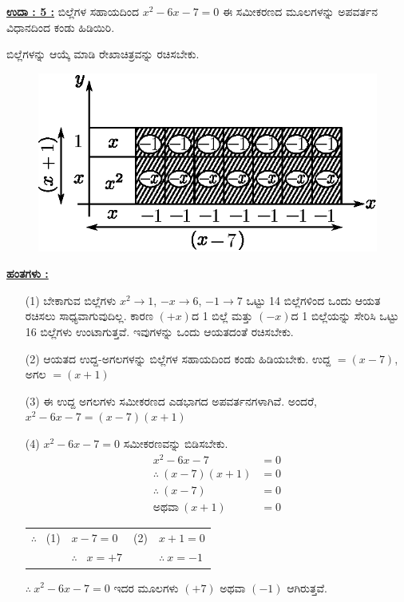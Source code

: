 \noindent
{\textbf{\underline{ಉದಾ : 5 :}}} ಬಿಲ್ಲೆಗಳ ಸಹಾಯದಿಂದ $x^2 - 6x - 7 = 0$ ಈ ಸಮೀಕರಣದ ಮೂಲ\-ಗಳನ್ನು ಅಪವರ್ತನ ವಿಧಾನದಿಂದ ಕಂಡು ಹಿಡಿಯಿರಿ. 

ಬಿಲ್ಲೆಗಳನ್ನು ಆಯ್ಕೆ ಮಾಡಿ ರೇಖಾಚಿತ್ರವನ್ನು ರಚಿಸಬೇಕು.
\begin{figure}[H]
\centering
\includegraphics[scale=0.8]{src/figure/chap3/fig3-55b.eps}
\end{figure}

\noindent
{\textbf{\underline{ಹಂತಗಳು :}}}
\begin{itemize}
\item [(1)] ಬೇಕಾಗುವ ಬಿಲ್ಲೆಗಳು $x^2 \rightarrow 1$, $-x \rightarrow 6$, $-1 \rightarrow 7$ ಒಟ್ಟು 14 ಬಿಲ್ಲೆಗಳಿಂದ ಒಂದು ಆಯತ ರಚಿಸಲು ಸಾಧ್ಯವಾಗುವುದಿಲ್ಲ. ಕಾರಣ $(+x)$ದ 1 ಬಿಲ್ಲೆ ಮತ್ತು $(-x)$ದ 1 ಬಿಲ್ಲೆಯನ್ನು ಸೇರಿಸಿ ಒಟ್ಟು 16 ಬಿಲ್ಲೆಗಳು ಉಂಟಾಗುತ್ತವೆ. ಇವುಗಳನ್ನು ಒಂದು ಆಯತದಂತೆ ರಚಿಸಬೇಕು. 
\item [(2)] ಆಯತದ ಉದ್ದ-ಅಗಲಗಳನ್ನು ಬಿಲ್ಲೆಗಳ ಸಹಾಯದಿಂದ ಕಂಡು ಹಿಡಿಯಬೇಕು. ಉದ್ದ $= (x-7)$, ಅಗಲ $= (x+1)$
\item [(3)] ಈ ಉದ್ದ ಅಗಲಗಳು ಸಮೀಕರಣದ ಎಡಭಾಗದ ಅಪವರ್ತನಗಳಾಗಿವೆ. ಅಂದರೆ, $x^2 - 6x - 7 = (x-7)(x+1)$
 \item [(4)] $x^2 - 6x - 7 = 0$ ಸಮೀಕರಣವನ್ನು ಬಿಡಿಸಬೇಕು.
\begin{align*}
x^2 - 6x - 7 & = 0\\
\therefore~ (x-7)(x+1) & = 0\\
\therefore~ (x-7) & = 0\tag{1}\\
\text{ಅಥವಾ}~ (x+1) & = 0\tag{2}
\end{align*}

\begin{tabular}{llll}
$\therefore$~ (1) & $x - 7 = 0$ & (2) & $x + 1 = 0$\\
& $\therefore$~ $x = +7$ & &$\therefore~ x = -1$
\end{tabular}

$\therefore~ x^2 - 6x -7 = 0$ ಇದರ ಮೂಲಗಳು $(+7)$ ಅಥವಾ $(-1)$ ಆಗಿರುತ್ತವೆ. 
\end{itemize}


